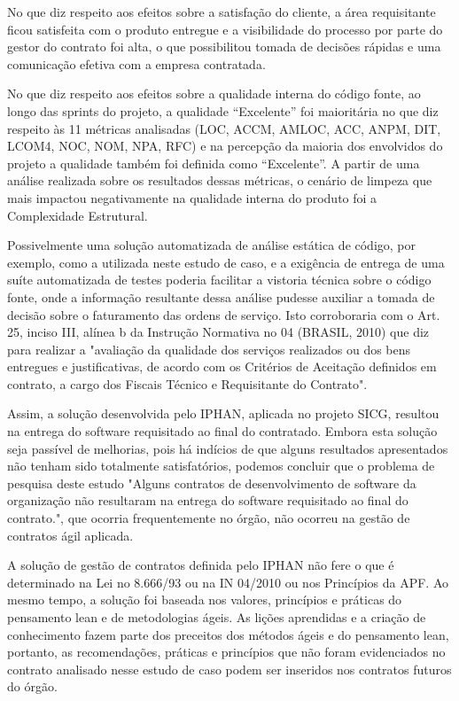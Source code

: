 No que diz respeito aos efeitos sobre a satisfação do cliente, a área requisitante
 ficou satisfeita com o produto entregue e a visibilidade do processo por parte do gestor
 do contrato foi alta, o que possibilitou tomada de decisões rápidas e uma comunicação
 efetiva com a empresa contratada.

No que diz respeito aos efeitos sobre a qualidade interna do código fonte, ao longo
 das sprints do projeto, a qualidade “Excelente” foi maioritária no que diz respeito às 11
 métricas analisadas (LOC, ACCM, AMLOC, ACC, ANPM, DIT, LCOM4, NOC, NOM,
 NPA, RFC) e na percepção da maioria dos envolvidos do projeto a qualidade também
 foi definida como “Excelente”. A partir de uma análise realizada sobre os resultados dessas métricas, o cenário de limpeza que mais impactou negativamente na qualidade interna do produto foi a Complexidade Estrutural.

Possivelmente uma solução automatizada de análise estática de código, por exemplo, como a utilizada neste estudo de caso, e a exigência de entrega de uma suíte automatizada de testes poderia facilitar a vistoria técnica sobre o
 código fonte, onde a informação resultante dessa análise pudesse auxiliar a tomada de
 decisão sobre o faturamento das ordens de serviço. Isto corroboraria com o Art. 25, inciso III, alínea b da Instrução Normativa no 04 (BRASIL, 2010) que diz para realizar a
 "avaliação da qualidade dos serviços realizados ou dos bens entregues e justificativas, de
 acordo com os Critérios de Aceitação definidos em contrato, a cargo dos Fiscais Técnico
 e Requisitante do Contrato".

Assim, a solução desenvolvida pelo IPHAN, aplicada no projeto SICG, resultou na
 entrega do software requisitado ao final do contratado. Embora esta solução seja passível
 de melhorias, pois há indícios de que alguns resultados apresentados não tenham sido
 totalmente satisfatórios, podemos concluir que o problema de pesquisa deste estudo "Alguns contratos de desenvolvimento de software da organização não resultaram na entrega
 do software requisitado ao final do contrato.", que ocorria frequentemente no órgão, não
 ocorreu na gestão de contratos ágil aplicada.

A solução de gestão de contratos definida pelo
 IPHAN não fere o que é determinado na Lei no 8.666/93 ou na IN 04/2010 ou nos Princípios da APF. Ao mesmo tempo, a solução foi baseada nos valores, princípios e práticas
 do pensamento lean e de metodologias ágeis. As lições aprendidas e a criação de conhecimento fazem parte dos preceitos dos métodos ágeis e do pensamento lean, portanto, as
 recomendações, práticas e princípios que não foram evidenciados no contrato analisado
 nesse estudo de caso podem ser inseridos nos contratos futuros do órgão.
